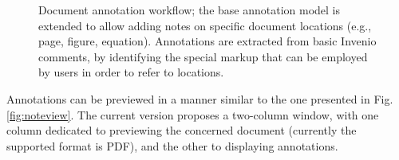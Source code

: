 \begin{figure}[!ht]
  \centering
  \caption[Document annotation workflow]
          {Document annotation workflow; the base annotation model is extended
           to allow adding notes on specific document locations (e.g., page,
           figure, equation). Annotations are extracted from basic Invenio
           comments, by identifying the special markup that can be employed by
           users in order to refer to locations.}
  \label{fig:docanno}
\end{figure}

Annotations can be previewed in a manner similar to the one presented
in Fig. \ref{fig:noteview}. The current version proposes a two-column window,
with one column dedicated to previewing the concerned document (currently the
supported format is PDF), and the other to displaying annotations.

\newpage

